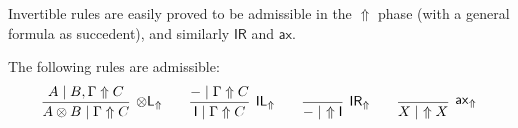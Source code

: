 \documentclass[runningheads]{llncs}
\newcommand{\tl}{\otimes \mathsf{L}}
\newcommand{\pass}{\mathsf{pass}}
\newcommand{\unitl}{\mathsf{IL}}
\newcommand{\unitr}{\mathsf{IR}}
\newcommand{\otL}{\tl}
\newcommand{\IL}{\unitl}
\newcommand{\IR}{\unitr}
\newcommand{\ax}{\mathsf{ax}}
\newcommand{\ot}{\otimes}
\newcommand{\I}{\mathsf{I}}
\newcommand{\up}{\Uparrow}
\begin{document}
Invertible rules are easily proved to be admissible in the $\up$ phase (with a general formula as succedent), and similarly $\IR$ and  $\ax$.
\begin{proposition}\label{eq:inv}
  The following rules are admissible:
  \begin{equation*}
  \begin{array}{c}
    \infer[\otL_\up]{A \ot B \mid \Gamma \up C}{A \mid  B , \Gamma \up C}
    \qquad
    \infer[\IL_\up]{\I \mid \Gamma \up C}{- \mid \Gamma \up C}
    \qquad
    \infer[\IR_\up]{- \mid ~ \up \I}{}
    \qquad
    \infer[\ax_\up]{X \mid ~ \up X}{}    
  \end{array}
  \end{equation*}
\end{proposition}
\end{document}
